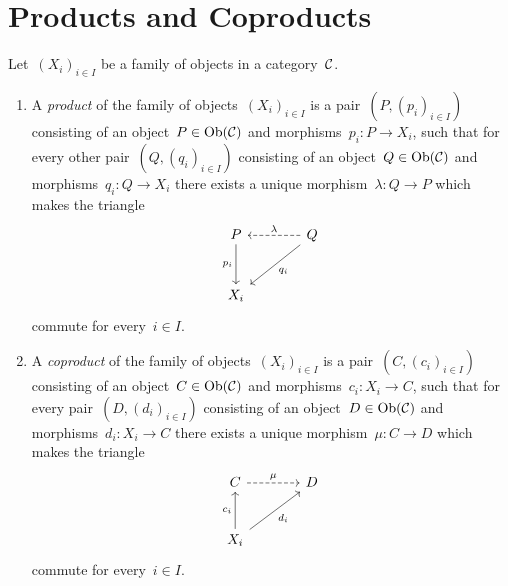 




\section{Products and Coproducts}

\begin{definition}
  Let~$(X_i)_{i \in I}$ be a family of objects in a category~$\mathcal{C}$.
  \begin{enumerate}
    \item
      A \emph{product} of the family of objects~$(X_i)_{i \in I}$ is a pair~$(P, (p_i)_{i \in I})$ consisting of an object~$P \in \operatorname{Ob}(\mathcal{C})$ and morphisms~$p_i \colon P \to X_i$, such that for every other pair~$(Q, (q_i)_{i \in I})$ consisting of an object~$Q \in \operatorname{Ob}(\mathcal{C})$ and morphisms~$q_i \colon Q \to X_i$ there exists a unique morphism~$\lambda \colon Q \to P$ which makes the triangle
      \[
        \begin{tikzcd}[sep = large]
            P
            \arrow{d}[left]{p_i}
          & Q
            \arrow{dl}[below right]{q_i}
            \arrow[dashed]{l}[above]{\lambda}
          \\
            X_i
          & {}
        \end{tikzcd}
      \]
      commute for every~$i \in I$.
    \item
      A \emph{coproduct} of the family of objects~$(X_i)_{i \in I}$ is a pair~$(C, (c_i)_{i \in I})$ consisting of an object~$C \in \operatorname{Ob}(\mathcal{C})$ and morphisms~$c_i \colon X_i \to C$, such that for every pair~$(D, (d_i)_{i \in I})$ consisting of an object~$D \in \operatorname{Ob}(\mathcal{C})$ and morphisms~$d_i \colon X_i \to C$ there exists a unique morphism~$\mu \colon C \to D$ which makes the triangle
      \[
        \begin{tikzcd}[sep = large]
            C
            \arrow[dashed]{r}[above]{\mu}
          & D
          \\
            X_i
            \arrow{u}[left]{c_i}
            \arrow{ur}[below right]{d_i}
          & {}
        \end{tikzcd}
      \]
      commute for every~$i \in I$.
  \end{enumerate}
\end{definition}


